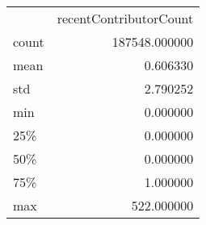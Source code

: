 \begin{tabular}{lr}
 & recentContributorCount \\
count & 187548.000000 \\
mean & 0.606330 \\
std & 2.790252 \\
min & 0.000000 \\
25\% & 0.000000 \\
50\% & 0.000000 \\
75\% & 1.000000 \\
max & 522.000000 \\
\end{tabular}
